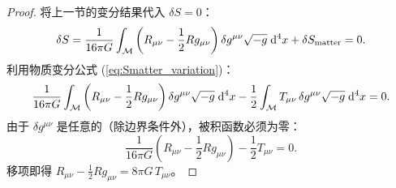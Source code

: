 \begin{proof}
将上一节的变分结果代入 $\delta S = 0$：
\begin{equation}
    \delta S = \frac{1}{16\pi G} \int_{\mathcal{M}} \left(R_{\mu\nu} - \frac{1}{2}R g_{\mu\nu}\right) \delta g^{\mu\nu} \sqrt{-g} \; \dd^4 x
    + \delta S_{\text{matter}} = 0.
\end{equation}
利用物质变分公式 (\ref{eq:Smatter_variation})：
\begin{equation}
    \frac{1}{16\pi G} \int_{\mathcal{M}} \left(R_{\mu\nu} - \frac{1}{2}R g_{\mu\nu}\right) \delta g^{\mu\nu} \sqrt{-g} \; \dd^4 x
    - \frac{1}{2} \int_{\mathcal{M}} T_{\mu\nu} \, \delta g^{\mu\nu} \sqrt{-g} \; \dd^4 x = 0.
\end{equation}
由于 $\delta g^{\mu\nu}$ 是任意的（除边界条件外），被积函数必须为零：
\begin{equation}
    \frac{1}{16\pi G}\left(R_{\mu\nu} - \frac{1}{2}R g_{\mu\nu}\right) - \frac{1}{2} T_{\mu\nu} = 0.
\end{equation}
移项即得 $R_{\mu\nu} - \frac{1}{2}R g_{\mu\nu} = 8\pi G \, T_{\mu\nu}$。
\end{proof}

